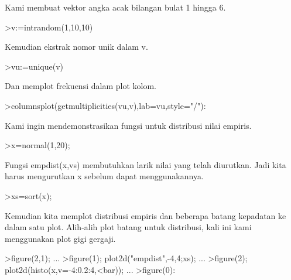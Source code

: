 \documentclass[a4paper,10pt]{article}
\begin{document}
\begin{eulernotebook}
\begin{eulercomment}
Kami membuat vektor angka acak bilangan bulat 1 hingga 6.
\end{eulercomment}
\begin{eulerprompt}
>v:=intrandom(1,10,10)
\end{eulerprompt}
\begin{euleroutput}
  [8,  5,  8,  8,  6,  8,  8,  3,  5,  5]
\end{euleroutput}
\begin{eulercomment}
Kemudian ekstrak nomor unik dalam v.
\end{eulercomment}
\begin{eulerprompt}
>vu:=unique(v)
\end{eulerprompt}
\begin{euleroutput}
  [3,  5,  6,  8]
\end{euleroutput}
\begin{eulercomment}
Dan memplot frekuensi dalam plot kolom.
\end{eulercomment}
\begin{eulerprompt}
>columnsplot(getmultiplicities(vu,v),lab=vu,style="/"):
\end{eulerprompt}
\begin{eulercomment}
Kami ingin mendemonstrasikan fungsi untuk distribusi nilai empiris.
\end{eulercomment}
\begin{eulerprompt}
>x=normal(1,20);
\end{eulerprompt}
\begin{eulercomment}
Fungsi empdist(x,vs) membutuhkan larik nilai yang telah diurutkan.
Jadi kita harus mengurutkan x sebelum dapat menggunakannya.
\end{eulercomment}
\begin{eulerprompt}
>xs=sort(x);
\end{eulerprompt}
\begin{eulercomment}
Kemudian kita memplot distribusi empiris dan beberapa batang kepadatan
ke dalam satu plot. Alih-alih plot batang untuk distribusi, kali ini
kami menggunakan plot gigi gergaji.
\end{eulercomment}
\begin{eulerprompt}
>figure(2,1); ...
>figure(1); plot2d("empdist",-4,4;xs); ...
>figure(2); plot2d(histo(x,v=-4:0.2:4,<bar));  ...
>figure(0):
\end{eulerprompt}
\begin{eulercomment}

\end{eulercomment}
\end{eulernotebook}
\end{document}

